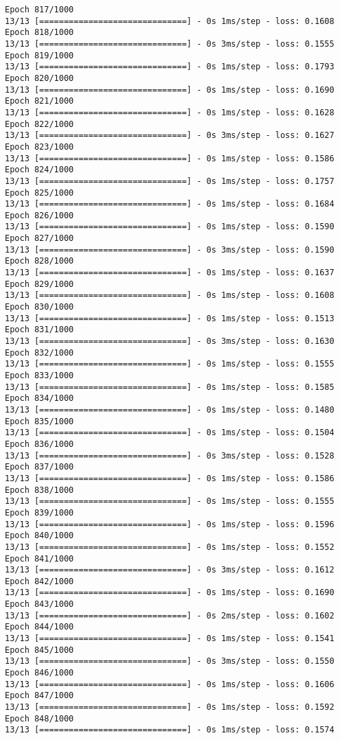\documentclass[11pt]{article}
\begin{document}
\begin{Verbatim}[commandchars=\\\{\}]
Epoch 817/1000
13/13 [==============================] - 0s 1ms/step - loss: 0.1608
Epoch 818/1000
13/13 [==============================] - 0s 3ms/step - loss: 0.1555
Epoch 819/1000
13/13 [==============================] - 0s 1ms/step - loss: 0.1793
Epoch 820/1000
13/13 [==============================] - 0s 1ms/step - loss: 0.1690
Epoch 821/1000
13/13 [==============================] - 0s 1ms/step - loss: 0.1628
Epoch 822/1000
13/13 [==============================] - 0s 3ms/step - loss: 0.1627
Epoch 823/1000
13/13 [==============================] - 0s 1ms/step - loss: 0.1586
Epoch 824/1000
13/13 [==============================] - 0s 1ms/step - loss: 0.1757
Epoch 825/1000
13/13 [==============================] - 0s 1ms/step - loss: 0.1684
Epoch 826/1000
13/13 [==============================] - 0s 1ms/step - loss: 0.1590
Epoch 827/1000
13/13 [==============================] - 0s 3ms/step - loss: 0.1590
Epoch 828/1000
13/13 [==============================] - 0s 1ms/step - loss: 0.1637
Epoch 829/1000
13/13 [==============================] - 0s 1ms/step - loss: 0.1608
Epoch 830/1000
13/13 [==============================] - 0s 1ms/step - loss: 0.1513
Epoch 831/1000
13/13 [==============================] - 0s 3ms/step - loss: 0.1630
Epoch 832/1000
13/13 [==============================] - 0s 1ms/step - loss: 0.1555
Epoch 833/1000
13/13 [==============================] - 0s 1ms/step - loss: 0.1585
Epoch 834/1000
13/13 [==============================] - 0s 1ms/step - loss: 0.1480
Epoch 835/1000
13/13 [==============================] - 0s 1ms/step - loss: 0.1504
Epoch 836/1000
13/13 [==============================] - 0s 3ms/step - loss: 0.1528
Epoch 837/1000
13/13 [==============================] - 0s 1ms/step - loss: 0.1586
Epoch 838/1000
13/13 [==============================] - 0s 1ms/step - loss: 0.1555
Epoch 839/1000
13/13 [==============================] - 0s 1ms/step - loss: 0.1596
Epoch 840/1000
13/13 [==============================] - 0s 1ms/step - loss: 0.1552
Epoch 841/1000
13/13 [==============================] - 0s 3ms/step - loss: 0.1612
Epoch 842/1000
13/13 [==============================] - 0s 1ms/step - loss: 0.1690
Epoch 843/1000
13/13 [==============================] - 0s 2ms/step - loss: 0.1602
Epoch 844/1000
13/13 [==============================] - 0s 1ms/step - loss: 0.1541
Epoch 845/1000
13/13 [==============================] - 0s 3ms/step - loss: 0.1550
Epoch 846/1000
13/13 [==============================] - 0s 1ms/step - loss: 0.1606
Epoch 847/1000
13/13 [==============================] - 0s 1ms/step - loss: 0.1592
Epoch 848/1000
13/13 [==============================] - 0s 1ms/step - loss: 0.1574

\end{Verbatim}
\end{document}

